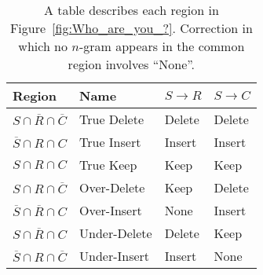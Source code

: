\documentclass[11pt]{article}
\begin{document}
\begin{table}[!t]
    \centering
    \setlength{\tabcolsep}{4pt}
    \begin{tabular}{l|l|ll}
        \hline
        Region & Name & $S \to R$ & $S \to C$ \\
        \hline
        $S \cap \overline{R} \cap \overline{C} $ & \textsf{True Delete} & Delete & Delete \\
        $\overline{S} \cap R \cap C$ & \textsf{True Insert} & Insert & Insert \\
        $S \cap R \cap C$ & \textsf{True Keep} & Keep & Keep \\
        \hline
        $S \cap R \cap \overline{C}$ & \textsf{Over-Delete} & Keep & Delete \\
        $\overline{S} \cap \overline{R} \cap C$ & \textsf{Over-Insert} & None & Insert \\
        \hline
        $S \cap \overline{R} \cap C$ & \textsf{Under-Delete} & Delete & Keep \\
        $\overline{S} \cap R \cap \overline{C}$ & \textsf{Under-Insert} & Insert & None \\
        \hline
    \end{tabular}
    \caption{A table describes each region in Figure~\ref{fig:Who_are_you_?}. Correction in which no $n$-gram appears in the common region involves ``None''.}
    \label{tab:classification}
\end{table}
\end{document}
